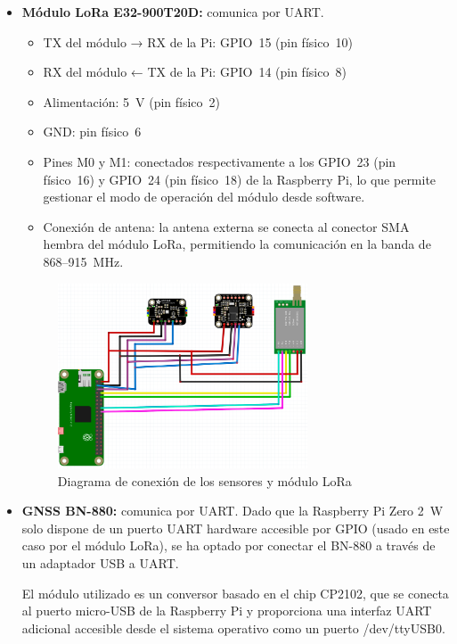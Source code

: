\begin{itemize}
    \item \textbf{Módulo LoRa E32-900T20D:} comunica por UART.
    \begin{itemize}
        \item TX del módulo → RX de la Pi: GPIO~15 (pin físico~10)
        \item RX del módulo ← TX de la Pi: GPIO~14 (pin físico~8)
        \item Alimentación: 5~V (pin físico~2)
        \item GND: pin físico~6
        \item Pines M0 y M1: conectados respectivamente a los GPIO~23 (pin físico~16) y GPIO~24 (pin físico~18) de la Raspberry Pi, lo que permite gestionar el modo de operación del módulo desde software.
        \item Conexión de antena: la antena externa se conecta al conector SMA hembra del módulo LoRa, permitiendo la comunicación en la banda de 868–915~MHz.
    \end{itemize}
    \begin{figure}[H]
        \centering
        \includegraphics[width=0.7\textwidth]{Imagenes/Bitmap/conexion_sensores}
        \caption{Diagrama de conexión de los sensores y módulo LoRa}
        \label{fig:conexion_sensores}
    \end{figure}
    \item \textbf{GNSS BN-880:} comunica por UART. Dado que la Raspberry Pi Zero 2~W solo dispone de un puerto UART hardware accesible por GPIO (usado en este caso por el módulo LoRa),
    se ha optado por conectar el BN-880 a través de un adaptador USB a UART.

    El módulo utilizado es un conversor basado en el chip CP2102, que se conecta al puerto micro-USB de la Raspberry Pi y proporciona una interfaz UART adicional accesible desde el sistema operativo como un puerto /dev/ttyUSB0.


\end{itemize}
